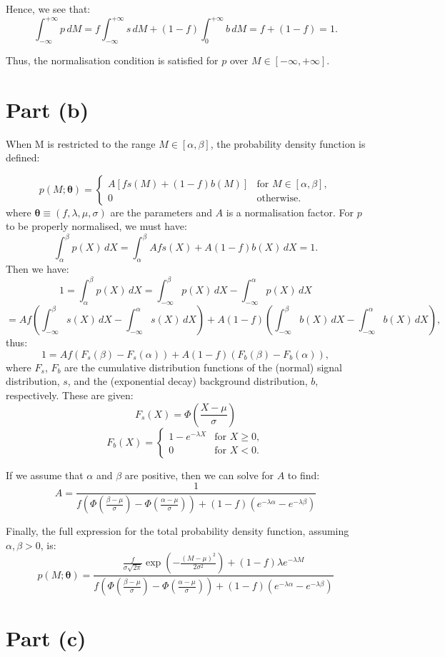 \documentclass{article}
\begin{document}
Hence, we see that:
\[ 
\int_{-\infty}^{+\infty} p \, dM = 
f\int_{-\infty}^{+\infty} s \, dM + 
(1-f)\int_{0}^{+\infty} b \, dM =
f + (1-f) = 1.
\]

Thus, the normalisation condition is satisfied for $p$ over $M \in [-\infty, +\infty]$.

\section*{Part (b)}

When M is restricted to the range $M \in [\alpha, \beta]$, the probability density function is defined:

\[ 
p(M; \boldsymbol{\theta}) = 
\begin{cases} 
A[fs(M) + (1-f)b(M)] & \text{for } M \in [\alpha, \beta], \\
0 & \text{otherwise}.
\end{cases}
\]
where $\boldsymbol{\theta} \equiv (f, \lambda, \mu, \sigma)$ are the parameters and $A$ is a normalisation factor. For $p$ to be properly normalised, we must have:
\[
\int_{\alpha}^{\beta} p(X) \, dX =
\int_{\alpha}^{\beta} Afs(X) + A(1-f)b(X) \, dX = 1.
\]
Then we have:
\[
1 = \int_{\alpha}^{\beta} p(X) \, dX = 
\int_{-\infty}^{\beta} p(X) \, dX - \int_{-\infty}^{\alpha} p(X) \, dX
\]
\[
= Af \left( \int_{-\infty}^{\beta} s(X) \, dX - \int_{-\infty}^{\alpha} s(X) \, dX \right) +
A(1-f)\left( \int_{-\infty}^{\beta} b(X) \, dX - \int_{-\infty}^{\alpha} b(X) \, dX \right),
\]
thus:
\[
1 = Af \left( F_s(\beta) - F_s(\alpha) \right) +
A(1-f)\left( F_b(\beta) - F_b(\alpha) \right),
\]
where $F_s$, $F_b$ are the cumulative distribution functions of the (normal) signal distribution, $s$, and the (exponential decay) background distribution, $b$, respectively. These are given:
\[
F_s(X) = \Phi(\frac{X-\mu}{\sigma})
\]
\[
F_b(X) = 
\begin{cases} 
1 - e^{-\lambda X} & \text{for } X \geq 0, \\
0 & \text{for } X < 0.
\end{cases}
\]

If we assume that $\alpha$ and $\beta$ are positive, then we can solve for $A$ to find:
\[
A = \frac{1}{
f \left( \Phi(\frac{\beta-\mu}{\sigma}) - \Phi(\frac{\alpha-\mu}{\sigma}) \right) +
(1-f)( e^{-\lambda\alpha} - e^{-\lambda\beta} )
}
\]

Finally, the full expression for the total probability density function, assuming $\alpha, \beta > 0$, is:
\[
p(M; \boldsymbol{\theta}) = 
\frac{
\frac{f}{\sigma\sqrt{2\pi}} \exp\left(-\frac{(M - \mu)^2}{2\sigma^2}\right) + (1-f)\lambda e^{-\lambda M}
}
{
f \left( \Phi(\frac{\beta-\mu}{\sigma}) - \Phi(\frac{\alpha-\mu}{\sigma}) \right) +
(1-f)( e^{-\lambda\alpha} - e^{-\lambda\beta} )
}
\]

\section*{Part (c)}
\end{document}

